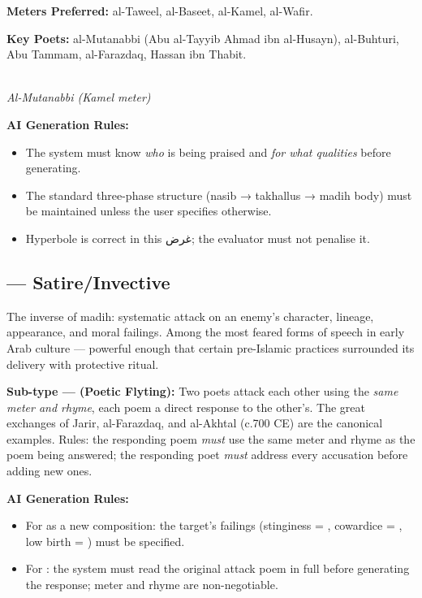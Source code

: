 \textbf{Meters Preferred:} al-Taweel, al-Baseet, al-Kamel, al-Wafir.

\textbf{Key Poets:} al-Mutanabbi (Abu al-Tayyib Ahmad ibn al-Husayn), al-Buhturi, Abu Tammam, al-Farazdaq, Hassan ibn Thabit.

\begin{verseframe}
\centering{}\\[4pt]
\small\textit{Al-Mutanabbi (Kamel meter)}
\end{verseframe}

\textbf{AI Generation Rules:}
\begin{itemize}
  \item The system must know \textit{who} is being praised and \textit{for what qualities} before generating.
  \item The standard three-phase structure (nasib → takhallus → madih body) must be maintained unless the user specifies otherwise.
  \item Hyperbole is correct in this غرض; the evaluator must not penalise it.
\end{itemize}

\subsection{ — Satire/Invective}
\label{subsec:hija}

The inverse of madih: systematic attack on an enemy's character, lineage, appearance, and moral failings. Among the most feared forms of speech in early Arab culture — powerful enough that certain pre-Islamic practices surrounded its delivery with protective ritual.

\textbf{Sub-type —  (Poetic Flyting):} Two poets attack each other using the \textit{same meter and rhyme}, each poem a direct response to the other's. The great  exchanges of Jarir, al-Farazdaq, and al-Akhtal (c.700 CE) are the canonical examples. Rules: the responding poem \textit{must} use the same meter and rhyme as the poem being answered; the responding poet \textit{must} address every accusation before adding new ones.

\textbf{AI Generation Rules:}
\begin{itemize}
  \item For  as a new composition: the target's failings (stinginess = , cowardice = , low birth = ) must be specified.
  \item For : the system must read the original attack poem in full before generating the response; meter and rhyme are non-negotiable.
\end{itemize}

